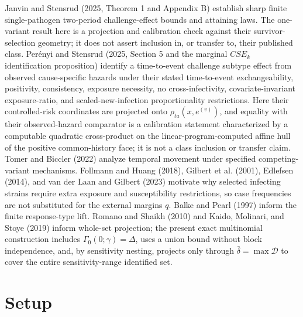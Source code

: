 \documentclass{article}
\begin{document}
Janvin and Stensrud (2025, Theorem 1 and Appendix B) establish sharp finite single-pathogen two-period challenge-effect bounds and attaining laws. The one-variant result here is a projection and calibration check against their survivor-selection geometry; it does not assert inclusion in, or transfer to, their published class. Perényi and Stensrud (2025, Section 5 and the marginal \(CSE_k\) identification proposition) identify a time-to-event challenge subtype effect from observed cause-specific hazards under their stated time-to-event exchangeability, positivity, consistency, exposure necessity, no cross-infectivity, covariate-invariant exposure-ratio, and scaled-new-infection proportionality restrictions. Here their controlled-risk coordinates are projected onto \(\rho_{ta}(x,e^{(v)})\), and equality with their observed-hazard comparator is a calibration statement characterized by a computable quadratic cross-product on the linear-program-computed affine hull of the positive common-history face; it is not a class inclusion or transfer claim. Tomer and Biccler (2022) analyze temporal movement under specified competing-variant mechanisms. Follmann and Huang (2018), Gilbert et al. (2001), Edlefsen (2014), and van der Laan and Gilbert (2023) motivate why selected infecting strains require extra exposure and susceptibility restrictions, so case frequencies are not substituted for the external margins \(q\). Balke and Pearl (1997) inform the finite response-type lift. Romano and Shaikh (2010) and Kaido, Molinari, and Stoye (2019) inform whole-set projection; the present exact multinomial construction includes \(\Gamma_0(0;\gamma)=\Delta\), uses a union bound without block independence, and, by sensitivity nesting, projects only through \(\bar\delta=\max\mathcal D\) to cover the entire sensitivity-range identified set.

\section{Setup}
\end{document}
